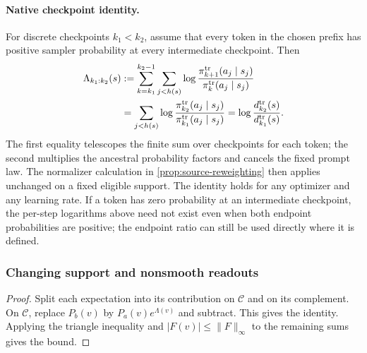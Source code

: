 \paragraph{Native checkpoint identity.}
For discrete checkpoints $k_1<k_2$, assume that every token in the chosen prefix has positive sampler probability at every intermediate checkpoint. Then
\[
 \begin{aligned}
 \Lambda_{k_1:k_2}(s)
 &:=\sum_{k=k_1}^{k_2-1}\sum_{j<h(s)}
       \log\frac{\pi_{k+1}^{\rm tr}(a_j\mid s_j)}{\pi_k^{\rm tr}(a_j\mid s_j)}\\
 &=\sum_{j<h(s)}\log\frac{\pi_{k_2}^{\rm tr}(a_j\mid s_j)}{\pi_{k_1}^{\rm tr}(a_j\mid s_j)}
 =\log\frac{d_{k_2}^{\rm tr}(s)}{d_{k_1}^{\rm tr}(s)}.
 \end{aligned}
\]
The first equality telescopes the finite sum over checkpoints for each token; the second multiplies the ancestral probability factors and cancels the fixed prompt law. The normalizer calculation in \cref{prop:source-reweighting} then applies unchanged on a fixed eligible support. The identity holds for any optimizer and any learning rate. If a token has zero probability at an intermediate checkpoint, the per-step logarithms above need not exist even when both endpoint probabilities are positive; the endpoint ratio can still be used directly where it is defined.

\subsubsection{Changing support and nonsmooth readouts}
\label{app:transport}
\begin{proof}
Split each expectation into its contribution on $\mathcal C$ and on its complement. On $\mathcal C$, replace $P_b(v)$ by $P_a(v)e^{\Lambda(v)}$ and subtract. This gives the identity. Applying the triangle inequality and $|F(v)|\le\|F\|_\infty$ to the remaining sums gives the bound.
\end{proof}

